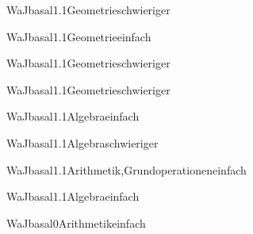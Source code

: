 \documentclass[12pt]{article}
\begin{document}
\begin{Add}{WaJ}{basal1.1}{Geometrie}{schwieriger}
\end{Add}

\begin{Add}{WaJ}{basal1.1}{Geometrie}{einfach}
\end{Add}

\begin{Add}{WaJ}{basal1.1}{Geometrie}{schwieriger}
\end{Add}

\begin{Add}{WaJ}{basal1.1}{Geometrie}{schwieriger}
\end{Add}

\begin{Add}{WaJ}{basal1.1}{Algebra}{einfach}
\end{Add}

\begin{Add}{WaJ}{basal1.1}{Algebra}{schwieriger}
\end{Add}

\begin{Add}{WaJ}{basal1.1}{Arithmetik,Grundoperationen}{einfach}
\end{Add}

\begin{Add}{WaJ}{basal1.1}{Algebra}{einfach}
\end{Add}

\begin{Add}{WaJ}{basal0}{Arithmetik}{einfach}
\end{Add}
\end{document}
